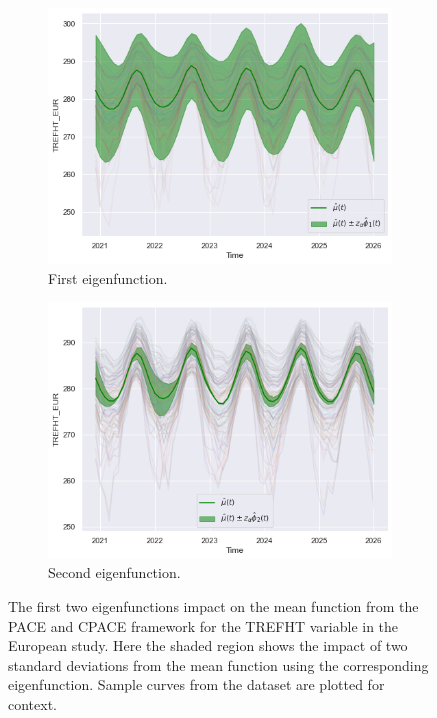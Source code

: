 \begin{figure}
	\centering
	\begin{subfigure}[b]{0.45\textwidth}
		\includegraphics[width=\textwidth]{phi_1_trefht_eur}
		\caption{First eigenfunction.}
		\label{fig:phi_1_trefht_eur}
	\end{subfigure}
	\hfill        
	\begin{subfigure}[b]{0.45\textwidth}
		\includegraphics[width=\textwidth]{phi_2_trefht_eur}
		\caption{Second eigenfunction.}
		\label{fig:phi_2_trefht_eur}
	\end{subfigure}
	\caption[The first two eigenfunctions impact on the mean function from the PACE and CPACE framework for the TREFHT variable in the European study.]{The first two eigenfunctions impact on the mean function from the PACE and CPACE framework for the TREFHT variable in the European study. Here the shaded region shows the impact of two standard deviations from the mean function using the corresponding eigenfunction. Sample curves from the dataset are plotted for context.}
	\label{fig:phi_trefht_eur}
\end{figure}

